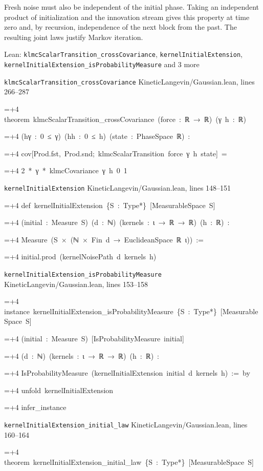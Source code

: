 \documentclass[11pt,a4paper]{article}
\newlength{\leancharwidth}
\newenvironment{leancode}{\par\smallskip\begingroup\ttfamily\footnotesize\raggedright
  \settowidth{\leancharwidth}{M}\setlength{\parskip}{0pt}\setlength{\parindent}{0pt}
  \frenchspacing}{\par\endgroup\smallskip}
\newcommand{\leanline}[2]{\hangindent=\dimexpr#1\leancharwidth+4\leancharwidth\relax
  \hangafter=1\noindent\hspace*{#1\leancharwidth}#2\par}
\newcommand{\leansource}[1]{\par{\footnotesize\color{leanmuted}#1}\par}
\begin{document}
Fresh noise must also be independent of the initial phase. Taking an independent product of initialization and the innovation stream gives this property at time zero and, by recursion, independence of the next block from the past. The resulting joint laws justify Markov iteration.

\begin{leanbox}{Lean: \texttt{klmcScalarTransition\_\allowbreak{}crossCovariance}, \texttt{kernelInitialExtension}, \texttt{kernelInitialExtension\_\allowbreak{}isProbabilityMeasure} and 3 more}
\leansource{\texttt{klmcScalarTransition\_\allowbreak{}crossCovariance} \quad KineticLangevin/\allowbreak{}Gaussian.lean, lines 266–287}
\begin{leancode}
\leanline{0}{theorem\ klmcScalarTransition\_crossCovariance\ (force\ :\ ℝ\ →\ ℝ)\ (γ\ h\ :\ ℝ)}
\leanline{4}{(hγ\ :\ 0\ ≤\ γ)\ (hh\ :\ 0\ ≤\ h)\ (state\ :\ PhaseSpace\ ℝ)\ :}
\leanline{4}{cov[Prod.fst,\ Prod.snd;\ klmcScalarTransition\ force\ γ\ h\ state]\ =}
\leanline{6}{2\ *\ γ\ *\ klmcCovariance\ γ\ h\ 0\ 1}
\end{leancode}
\leansource{\texttt{kernelInitialExtension} \quad KineticLangevin/\allowbreak{}Gaussian.lean, lines 148–151}
\begin{leancode}
\leanline{0}{def\ kernelInitialExtension\ \{S\ :\ Type*\}\ [MeasurableSpace\ S]}
\leanline{4}{(initial\ :\ Measure\ S)\ (d\ :\ ℕ)\ (kernels\ :\ ι\ →\ ℝ\ →\ ℝ)\ (h\ :\ ℝ)\ :}
\leanline{4}{Measure\ (S\ ×\ (ℕ\ ×\ Fin\ d\ →\ EuclideanSpace\ ℝ\ ι))\ :=}
\leanline{2}{initial.prod\ (kernelNoisePath\ d\ kernels\ h)}
\end{leancode}
\leansource{\texttt{kernelInitialExtension\_\allowbreak{}isProbabilityMeasure} \quad KineticLangevin/\allowbreak{}Gaussian.lean, lines 153–158}
\begin{leancode}
\leanline{0}{instance\ kernelInitialExtension\_isProbabilityMeasure\ \{S\ :\ Type*\}\ [MeasurableSpace\ S]}
\leanline{4}{(initial\ :\ Measure\ S)\ [IsProbabilityMeasure\ initial]}
\leanline{4}{(d\ :\ ℕ)\ (kernels\ :\ ι\ →\ ℝ\ →\ ℝ)\ (h\ :\ ℝ)\ :}
\leanline{4}{IsProbabilityMeasure\ (kernelInitialExtension\ initial\ d\ kernels\ h)\ :=\ by}
\leanline{2}{unfold\ kernelInitialExtension}
\leanline{2}{infer\_instance}
\end{leancode}
\leansource{\texttt{kernelInitialExtension\_\allowbreak{}initial\_\allowbreak{}law} \quad KineticLangevin/\allowbreak{}Gaussian.lean, lines 160–164}
\begin{leancode}
\leanline{0}{theorem\ kernelInitialExtension\_initial\_law\ \{S\ :\ Type*\}\ [MeasurableSpace\ S]}

\end{leancode}
\end{leanbox}
\end{document}
